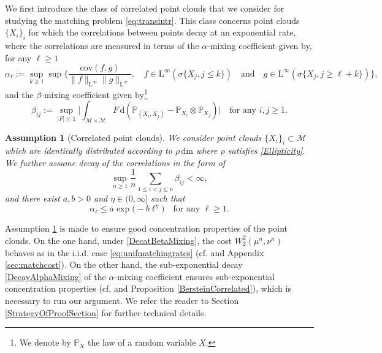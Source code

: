 \documentclass[11pt,a4paper,oneside]{amsart}
\numberwithin{equation}{section}
\newtheorem{assumption}[theorem]{Assumption}
\newcommand{\dd}{\mathrm{d}}
\newcommand{\LL}{\mathrm{L}}
\newcommand{\m}{\mathrm{m}}
\begin{document}
\medskip
We first introduce the class of correlated point clouds that we consider for studying the matching problem \eqref{eq:transintr}. This class concerns point clouds $\{X_i\}_i$ for which the correlations between points decay at an exponential rate, where the correlations are measured in terms of the $\alpha$-mixing coefficient given by, for any $\ell\geq 1$
%
\begin{equation}\label{AlphaMixing}
%
\alpha_\ell:=\sup_{k\geq 1}\sup\bigg\{\frac{\text{cov}(f,g)}{\|f\|_{\LL^{\infty}}\|g\|_{\LL^{\infty}}},\quad f\in\LL^{\infty}(\sigma\{X_j,j\leq k\})\quad \text{and}\quad g\in\LL^{\infty}(\sigma\{X_j,j\geq \ell+k\})\bigg\},
%
\end{equation}
%
and the $\beta$-mixing coefficient given by\footnote{We denote by $\mathbb{P}_X$ the law of a random variable $X$.}
%
\begin{equation}\label{BetaMixing}
%
\beta_{ij}:=\sup_{\vert F\vert\leq 1}\bigg\vert\int_{\mathcal{M}\times\mathcal{M}}F\,\dd (\mathbb{P}_{(X_i,X_j)}-\mathbb{P}_{X_i}\otimes\mathbb{P}_{X_j})\bigg\vert\quad \text{for any $i,j\geq 1$}.
%
\end{equation}
%
\begin{assumption}[Correlated point clouds]\label{Assumptions}
%
We consider point clouds $\{X_i\}_{i}\subset \mathcal{M}$ which are identically distributed according to $\rho\,\dd\m$ where $\rho$ satisfies \eqref{Ellipticity}. We further assume decay of the correlations in the form of 
%
\begin{equation}\label{DecatBetaMixing}
%
\sup_{n\geq 1}\frac{1}{n}\sum_{1\leq i<j\leq n}\beta_{ij}<\infty,
%
\end{equation}
%
and there exist $a,b>0$ and $\eta\in (0,\infty]$ such that 
%
\begin{equation}\label{DecayAlphaMixing}
%
\alpha_\ell\leq a\exp\big(-b\ell^{\eta}\big)\quad\text{for any $\ell\geq 1$.}
%
\end{equation}
%
\end{assumption}
%
Assumption \ref{Assumptions} is made to ensure good concentration properties of the point clouds. On the one hand, under \eqref{DecatBetaMixing}, the cost $W^2_2(\mu^n,\nu^n)$ behaves as in the i.i.d. case \eqref{eq:unifmatchingrates} (cf. \cite[Theorem 2]{borda2021empirical} and Appendix \ref{sec:matchcost}). On the other hand, the sub-exponential decay \eqref{DecayAlphaMixing} of the $\alpha$-mixing coefficient ensures sub-exponential concentration properties (cf. \cite[Theorem 1]{merlevede2011bernstein} and Proposition \ref{BersteinCorrelated}), which is necessary to run our argument. We refer the reader to Section \ref{StrategyOfProofSection} for further technical details.
\end{document}
